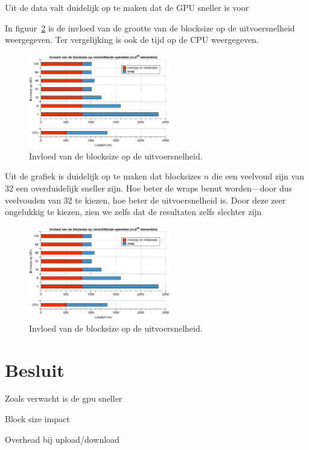 \documentclass[twocolumn, a4paper]{article}
\begin{document}
Uit de data valt duidelijk op te maken dat de GPU sneller is voor

In figuur~\ref{blocksize} is de invloed van de grootte van de blocksize op de uitvoersnelheid weergegeven. Ter vergelijking is ook de tijd op de CPU weergegeven.

\begin{figure}
\centering
\includegraphics[width=0.55\textwidth]{blocksize.eps}
\caption{Invloed van de blocksize op de uitvoersnelheid.}
\label{blocksize}
\end{figure}

Uit de grafiek is duidelijk op te maken dat blocksizes $n$ die een veelvoud zijn van 32 een overduidelijk sneller zijn. Hoe beter de wraps benut worden---door dus veelvouden van 32 te kiezen, hoe beter de uitvoersnelheid is. Door deze zeer ongelukkig te kiezen, zien we zelfs dat de resultaten zelfs slechter zijn 

\begin{figure}
  \centering
  \includegraphics[width=0.55\textwidth]{blocksize.eps}
  \caption{Invloed van de blocksize op de uitvoersnelheid.}
  \label{blocksize}
  \end{figure}

\section{Besluit}
Zoals verwacht is de gpu sneller

Block size impact

Overhead bij upload/download
\end{document}
